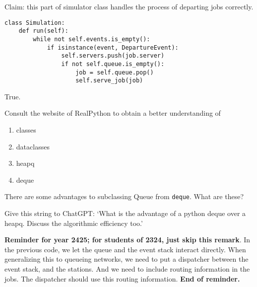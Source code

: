 \documentclass[stochastic-or.tex]{subfiles}
\begin{document}
\begin{truefalse}
Claim: this part of simulator class handles the process of departing jobs correctly.
\begin{verbatim}
class Simulation:
    def run(self):
        while not self.events.is_empty():
            if isinstance(event, DepartureEvent):
                self.servers.push(job.server)
                if not self.queue.is_empty():
                    job = self.queue.pop()
                    self.serve_job(job)
\end{verbatim}
\begin{solution}
True.
\end{solution}
\end{truefalse}


\begin{exercise}
Consult the website of RealPython to obtain a better understanding of
\begin{enumerate}
\item classes
\item dataclasses
\item heapq
\item deque
\end{enumerate}
\end{exercise}

\begin{exercise}
There are some advantages to subclassing  Queue from \texttt{deque}. What are these?
\begin{solution}
Give this string to ChatGPT: `What is the advantage of a python deque over a heapq. Discuss the algorithmic efficiency too.'
\end{solution}
\end{exercise}



\textbf{Reminder for year 2425; for students of 2324, just skip this remark}. In the previous code, we let the queue and the event stack interact directly. When generalizing this to queueing networks, we need to put a dispatcher between the event stack, and the stations. And we need to include routing information in the jobs. The dispatcher should use this routing information. \textbf{End of reminder.}


\end{document}
